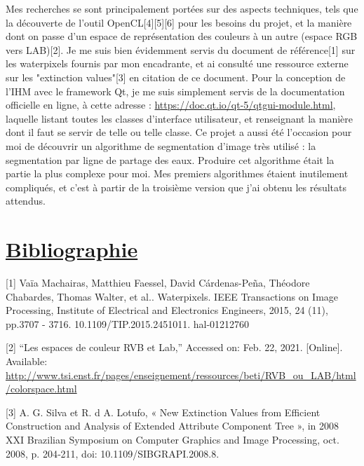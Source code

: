 \documentclass[notitlepage, a4paper, 12pt]{report}
\begin{document}
\begin{flushleft}
Mes recherches se sont principalement portées sur des aspects techniques, tels que la découverte de l'outil OpenCL[4][5][6] pour les besoins du projet, et la manière dont on passe d'un espace de représentation des couleurs à un autre (espace RGB vers LAB)[2].
\newline
\newline
Je me suis bien évidemment servis du document de référence[1] sur les waterpixels fournis par mon encadrante, et ai consulté une ressource externe sur les "extinction values"[3] en citation de ce document.
\newline
\newline
Pour la conception de l'IHM avec le framework Qt, je me suis simplement servis de la documentation officielle en ligne, à cette adresse : \url{https://doc.qt.io/qt-5/qtgui-module.html}, laquelle listant toutes les classes d'interface utilisateur, et renseignant la manière dont il faut se servir de telle ou telle classe.
\newline
\newline
Ce projet a aussi été l'occasion pour moi de découvrir un algorithme de segmentation d'image très utilisé : la segmentation par ligne de partage des eaux.\newline
Produire cet algorithme était la partie la plus complexe pour moi.\newline
Mes premiers algorithmes étaient inutilement compliqués, et c'est à partir de la troisième version que j'ai obtenu les résultats attendus.\newline

\section*{\underline{Bibliographie}}

[1] Vaïa Machairas, Matthieu Faessel, David Cárdenas-Peña, Théodore Chabardes, Thomas Walter, et
al.. Waterpixels. IEEE Transactions on Image Processing, Institute of Electrical and Electronics
Engineers, 2015, 24 (11), pp.3707 - 3716. 10.1109/TIP.2015.2451011. hal-01212760

\vspace{7mm}

[2] “Les espaces de couleur RVB et Lab,” Accessed on: Feb. 22, 2021. [Online]. Available: \url{http://www.tsi.enst.fr/pages/enseignement/ressources/beti/RVB_ou_LAB/html/colorspace.html}

\vspace{7mm}

[3]	A. G. Silva et R. d A. Lotufo, « New Extinction Values from Efficient Construction and Analysis of Extended Attribute Component Tree », in 2008 XXI Brazilian Symposium on Computer Graphics and Image Processing, oct. 2008, p. 204‑211, doi: 10.1109/SIBGRAPI.2008.8.


\end{flushleft}
\end{document}
